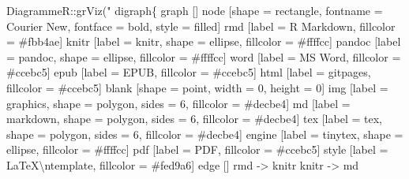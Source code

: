 \documentclass[12pt, oneside]{queensuthesis}
\numberwithin{equation}{chapter}       %
\newenvironment{Shaded}{\begin{snugshade}}{\end{snugshade}}
\newcommand{\FunctionTok}[1]{\textcolor[rgb]{0.00,0.00,0.00}{#1}}
\newcommand{\NormalTok}[1]{#1}
\newcommand{\SpecialCharTok}[1]{\textcolor[rgb]{0.00,0.00,0.00}{#1}}
\newcommand{\StringTok}[1]{\textcolor[rgb]{0.31,0.60,0.02}{#1}}
\begin{document}
\begin{Shaded}
\begin{Highlighting}[]
\NormalTok{DiagrammeR}\SpecialCharTok{::}\FunctionTok{grViz}\NormalTok{(}\StringTok{"}
\StringTok{                  digraph\{}
\StringTok{                  graph []}
\StringTok{                  node [shape = rectangle, fontname = \textquotesingle{}Courier New\textquotesingle{}, fontface = bold, style = filled]}
\StringTok{                    rmd [label = \textquotesingle{}R Markdown\textquotesingle{}, fillcolor = \textquotesingle{}\#fbb4ae\textquotesingle{}]}
\StringTok{                    knitr [label = \textquotesingle{}knitr\textquotesingle{}, shape = ellipse, fillcolor = \textquotesingle{}\#ffffcc\textquotesingle{}]}
\StringTok{                    pandoc [label = \textquotesingle{}pandoc\textquotesingle{}, shape = ellipse, fillcolor = \textquotesingle{}\#ffffcc\textquotesingle{}]}
\StringTok{                    word [label = \textquotesingle{}MS Word\textquotesingle{}, fillcolor = \textquotesingle{}\#ccebc5\textquotesingle{}]}
\StringTok{                    epub [label = \textquotesingle{}EPUB\textquotesingle{}, fillcolor = \textquotesingle{}\#ccebc5\textquotesingle{}]}
\StringTok{                    html [label = \textquotesingle{}gitpages\textquotesingle{}, fillcolor = \textquotesingle{}\#ccebc5\textquotesingle{}]}
\StringTok{                    blank [shape = point, width = 0, height = 0]}
\StringTok{                    img [label = \textquotesingle{}graphics\textquotesingle{}, shape = polygon, sides = 6, fillcolor = \textquotesingle{}\#decbe4\textquotesingle{}]}
\StringTok{                    md [label = \textquotesingle{}markdown\textquotesingle{}, shape = polygon, sides = 6, fillcolor = \textquotesingle{}\#decbe4\textquotesingle{}]}
\StringTok{                    tex [label = \textquotesingle{}tex\textquotesingle{}, shape = polygon, sides = 6, fillcolor = \textquotesingle{}\#decbe4\textquotesingle{}]}
\StringTok{                    engine [label = \textquotesingle{}tinytex\textquotesingle{}, shape = ellipse, fillcolor = \textquotesingle{}\#ffffcc\textquotesingle{}]}
\StringTok{                    pdf [label = \textquotesingle{}PDF\textquotesingle{}, fillcolor = \textquotesingle{}\#ccebc5\textquotesingle{}]}
\StringTok{                    style [label = \textquotesingle{}LaTeX}\SpecialCharTok{\textbackslash{}n}\StringTok{template\textquotesingle{}, fillcolor = \textquotesingle{}\#fed9a6\textquotesingle{}]}
\StringTok{                  edge []}
\StringTok{                    rmd {-}\textgreater{} knitr}
\StringTok{                    knitr {-}\textgreater{} md}

\end{Highlighting}
\end{Shaded}
\end{document}
